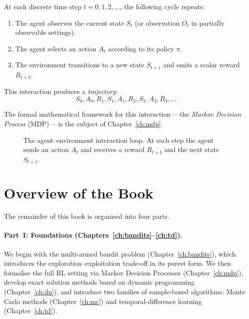 At each discrete time step $t=0,1,2,\dots$, the following cycle repeats:
\begin{enumerate}
\item The agent observes the current state $S_t$ (or observation $O_t$ in partially observable settings).
\item The agent selects an action $A_t$ according to its policy $\pi$.
\item The environment transitions to a new state $S_{t+1}$ and emits a scalar reward $R_{t+1}$.
\end{enumerate}

This interaction produces a \emph{trajectory}:
\begin{equation}
\label{eq:trajectory}
S_0, A_0, R_1, S_1, A_1, R_2, S_2, A_2, R_3, \dots
\end{equation}

The formal mathematical framework for this interaction\,---\,the \emph{Markov Decision Process} (MDP)\,---\,is the subject of Chapter~\ref{ch:mdp}.

\begin{figure}[ht]
\centering
{}
\caption{The agent--environment interaction loop.  At each step the agent sends an action $A_t$ and receives a reward $R_{t+1}$ and the next state $S_{t+1}$.}
\label{fig:agent-env}
\end{figure}


\section{Overview of the Book}
\label{sec:book-overview}

The remainder of this book is organised into four parts.

\paragraph{Part~I: Foundations (Chapters~\ref{ch:bandits}--\ref{ch:td}).}
We begin with the multi-armed bandit problem (Chapter~\ref{ch:bandits}), which introduces the exploration--exploitation trade-off in its purest form.  We then formalise the full RL setting via Markov Decision Processes (Chapter~\ref{ch:mdp}), develop exact solution methods based on dynamic programming (Chapter~\ref{ch:dp}), and introduce two families of sample-based algorithms: Monte Carlo methods (Chapter~\ref{ch:mc}) and temporal-difference learning (Chapter~\ref{ch:td}).

